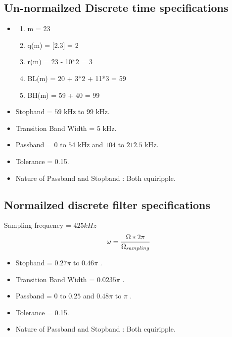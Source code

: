\documentclass{article}
\begin{document}
\subsection{Un-normailzed Discrete time specifications}

\begin{itemize}
    \item \begin{enumerate}
                \item m = 23
                \item q(m) = [2.3] = 2
                \item r(m) = 23 - 10*2 = 3
                \item BL(m) = 20 + 3*2 + 11*3 = 59
                \item BH(m) = 59 + 40 = 99
            \end{enumerate}

    \item Stopband = $59$ kHz to $99$ kHz.
    \item Transition Band Width = $5$ kHz.
    \item Passband = $0$ to $54$ kHz and $104$ to $212.5$ kHz.
    \item Tolerance = 0.15.
    \item Nature of Passband and Stopband : Both equiripple.
\end{itemize}


\subsection{Normailzed discrete filter specifications}
Sampling frequency = $425 kHz$\\
\begin{equation}
    \omega = \frac{\Omega * 2\pi}{\Omega _{sampling}}\\
\end{equation}

\begin{itemize}
    \item Stopband = $0.27\pi$ to $0.46\pi$ .
    \item Transition Band Width = $0.0235\pi$ .
    \item Passband = $0$ to $0.25$  and $0.48\pi$ to $\pi$ .
    \item Tolerance = 0.15.
    \item Nature of Passband and Stopband : Both equiripple.
\end{itemize}
\end{document}

